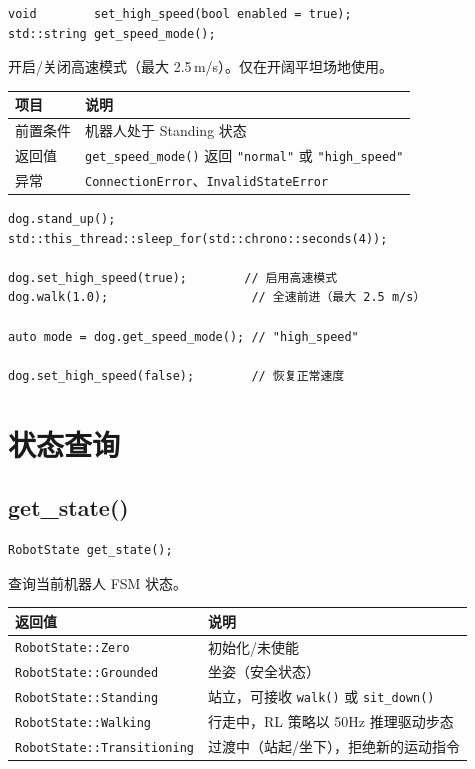 \documentclass[a4paper,11pt,openany]{book}
\begin{document}
\begin{lstlisting}[style=cpp,numbers=none]
void        set_high_speed(bool enabled = true);
std::string get_speed_mode();
\end{lstlisting}

开启/关闭高速模式（最大 2.5\,m/s）。仅在开阔平坦场地使用。

\begin{longtable}{ll}
\toprule
项目 & 说明 \\
\midrule
\endhead
前置条件 & 机器人处于 Standing 状态 \\
返回值 & \texttt{get\_speed\_mode()} 返回 \texttt{"normal"} 或 \texttt{"high\_speed"} \\
异常 & \texttt{ConnectionError}、\texttt{InvalidStateError} \\
\bottomrule
\end{longtable}

\begin{lstlisting}[style=cpp]
dog.stand_up();
std::this_thread::sleep_for(std::chrono::seconds(4));

dog.set_high_speed(true);        // 启用高速模式
dog.walk(1.0);                    // 全速前进（最大 2.5 m/s）

auto mode = dog.get_speed_mode(); // "high_speed"

dog.set_high_speed(false);        // 恢复正常速度
\end{lstlisting}

\section{状态查询}

\subsection{get\_state()}

\begin{lstlisting}[style=cpp,numbers=none]
RobotState get_state();
\end{lstlisting}

查询当前机器人 FSM 状态。

\begin{longtable}{ll}
\toprule
返回值 & 说明 \\
\midrule
\endhead
\texttt{RobotState::Zero}          & 初始化/未使能 \\
\texttt{RobotState::Grounded}      & 坐姿（安全状态）\\
\texttt{RobotState::Standing}      & 站立，可接收 \texttt{walk()} 或 \texttt{sit\_down()} \\
\texttt{RobotState::Walking}       & 行走中，RL 策略以 50Hz 推理驱动步态 \\
\texttt{RobotState::Transitioning} & 过渡中（站起/坐下），拒绝新的运动指令 \\
\bottomrule
\end{longtable}
\end{document}
